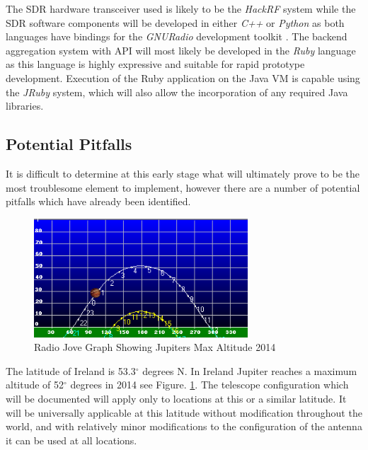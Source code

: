\documentclass[runningheads,a4paper]{llncs}
\begin{document}
The \gls{SDR} hardware transceiver used is likely to be the \textit{HackRF} system while the \gls{SDR} software components will be developed in either \textit{C++} or \textit{Python} as both languages have bindings for the \textit{GNURadio} development toolkit \citep{gnuradio-14}. The backend aggregation system with API will most likely be developed in the \textit{Ruby} language as this language is highly expressive and suitable for rapid prototype development. Execution of the Ruby application on the Java VM is capable using the \textit{JRuby} system, which will also allow the incorporation of any required Java libraries.


\subsection*{Potential Pitfalls}

It is difficult to determine at this early stage what will ultimately prove to be the most troublesome element to implement, however there are a number of potential pitfalls which have already been identified.

%
\begin{figure}[here]
\centering
\includegraphics[width=8cm]{images/11}
\caption{Radio Jove Graph Showing Jupiters Max Altitude 2014}
\label{fig:jupiter_max_altitude_2014}
\end{figure}
%

The latitude of Ireland is 53.3$^{\circ}$ degrees N. In Ireland Jupiter reaches a maximum altitude of 52$^{\circ}$ degrees in 2014 see Figure. \ref{fig:jupiter_max_altitude_2014}. The telescope configuration which will be documented will apply only to locations at this or a similar latitude. It will be universally applicable at this latitude without modification throughout the world, and with relatively minor modifications to the configuration of the antenna it can be used at all locations. \cite{nasa12}
\end{document}

